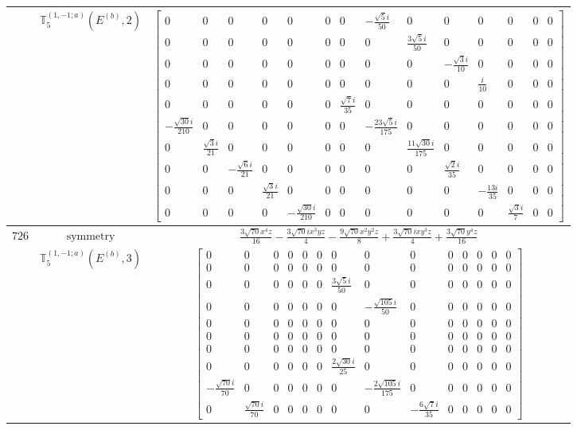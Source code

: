 \documentclass[fleqn,8pt,landscape]{jsarticle}
\begin{document}
\begin{longtable}{ccc}
$  $ & $ \mathbb{T}_{5}^{(1,-1;a)}(E^{(b)},2) $ & $ \begin{bmatrix} 0 & 0 & 0 & 0 & 0 & 0 & 0 & - \frac{\sqrt{5} i}{50} & 0 & 0 & 0 & 0 & 0 & 0 \\ 0 & 0 & 0 & 0 & 0 & 0 & 0 & 0 & \frac{3 \sqrt{5} i}{50} & 0 & 0 & 0 & 0 & 0 \\ 0 & 0 & 0 & 0 & 0 & 0 & 0 & 0 & 0 & - \frac{\sqrt{3} i}{10} & 0 & 0 & 0 & 0 \\ 0 & 0 & 0 & 0 & 0 & 0 & 0 & 0 & 0 & 0 & \frac{i}{10} & 0 & 0 & 0 \\ 0 & 0 & 0 & 0 & 0 & 0 & \frac{\sqrt{7} i}{35} & 0 & 0 & 0 & 0 & 0 & 0 & 0 \\ - \frac{\sqrt{30} i}{210} & 0 & 0 & 0 & 0 & 0 & 0 & - \frac{23 \sqrt{5} i}{175} & 0 & 0 & 0 & 0 & 0 & 0 \\ 0 & \frac{\sqrt{3} i}{21} & 0 & 0 & 0 & 0 & 0 & 0 & \frac{11 \sqrt{30} i}{175} & 0 & 0 & 0 & 0 & 0 \\ 0 & 0 & - \frac{\sqrt{6} i}{21} & 0 & 0 & 0 & 0 & 0 & 0 & \frac{\sqrt{2} i}{35} & 0 & 0 & 0 & 0 \\ 0 & 0 & 0 & \frac{\sqrt{3} i}{21} & 0 & 0 & 0 & 0 & 0 & 0 & - \frac{13 i}{35} & 0 & 0 & 0 \\ 0 & 0 & 0 & 0 & - \frac{\sqrt{30} i}{210} & 0 & 0 & 0 & 0 & 0 & 0 & \frac{\sqrt{3} i}{7} & 0 & 0 \end{bmatrix} $ \\ \hline
$ 726 $ & $ \text{symmetry} $ & $ \frac{3 \sqrt{70} x^{4} z}{16} - \frac{3 \sqrt{70} i x^{3} y z}{4} - \frac{9 \sqrt{70} x^{2} y^{2} z}{8} + \frac{3 \sqrt{70} i x y^{3} z}{4} + \frac{3 \sqrt{70} y^{4} z}{16} $ \\
$  $ & $ \mathbb{T}_{5}^{(1,-1;a)}(E^{(b)},3) $ & $ \begin{bmatrix} 0 & 0 & 0 & 0 & 0 & 0 & 0 & 0 & 0 & 0 & 0 & 0 & 0 & 0 \\ 0 & 0 & 0 & 0 & 0 & 0 & 0 & 0 & 0 & 0 & 0 & 0 & 0 & 0 \\ 0 & 0 & 0 & 0 & 0 & 0 & \frac{3 \sqrt{5} i}{50} & 0 & 0 & 0 & 0 & 0 & 0 & 0 \\ 0 & 0 & 0 & 0 & 0 & 0 & 0 & - \frac{\sqrt{105} i}{50} & 0 & 0 & 0 & 0 & 0 & 0 \\ 0 & 0 & 0 & 0 & 0 & 0 & 0 & 0 & 0 & 0 & 0 & 0 & 0 & 0 \\ 0 & 0 & 0 & 0 & 0 & 0 & 0 & 0 & 0 & 0 & 0 & 0 & 0 & 0 \\ 0 & 0 & 0 & 0 & 0 & 0 & 0 & 0 & 0 & 0 & 0 & 0 & 0 & 0 \\ 0 & 0 & 0 & 0 & 0 & 0 & \frac{2 \sqrt{30} i}{25} & 0 & 0 & 0 & 0 & 0 & 0 & 0 \\ - \frac{\sqrt{70} i}{70} & 0 & 0 & 0 & 0 & 0 & 0 & - \frac{2 \sqrt{105} i}{175} & 0 & 0 & 0 & 0 & 0 & 0 \\ 0 & \frac{\sqrt{70} i}{70} & 0 & 0 & 0 & 0 & 0 & 0 & - \frac{6 \sqrt{7} i}{35} & 0 & 0 & 0 & 0 & 0 \end{bmatrix} $ \\ \hline

\end{longtable}
\end{document}

